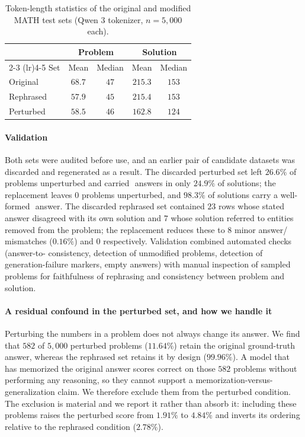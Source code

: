\begin{table}[h]
\centering
\caption{Token-length statistics of the original and modified MATH test sets (Qwen 3 tokenizer, $n=5{,}000$ each).}
\label{app:tab:modified_test_set_lengths}
\begin{tabular}{lcccc}
\toprule
& \multicolumn{2}{c}{Problem} & \multicolumn{2}{c}{Solution} \\
\cmidrule(lr){2-3} \cmidrule(lr){4-5}
Set & Mean & Median & Mean & Median \\
\midrule
Original  & $68.7$ & $47$ & $215.3$ & $153$ \\
Rephrased & $57.9$ & $45$ & $215.4$ & $153$ \\
Perturbed & $58.5$ & $46$ & $162.8$ & $124$ \\
\bottomrule
\end{tabular}
\end{table}

\paragraph{Validation}
Both sets were audited before use, and an earlier pair of candidate datasets was discarded and regenerated as a result.
The discarded perturbed set left $26.6\%$ of problems unperturbed and carried $\boxed{}$ answers in only $24.9\%$ of solutions; the replacement leaves $0$ problems unperturbed, and $98.3\%$ of solutions carry a well-formed $\boxed{}$ answer.
The discarded rephrased set contained $23$ rows whose stated answer disagreed with its own solution and $7$ whose solution referred to entities removed from the problem; the replacement reduces these to $8$ minor answer/$\boxed{}$ mismatches ($0.16\%$) and $0$ respectively.
Validation combined automated checks (answer-to-$\boxed{}$ consistency, detection of unmodified problems, detection of generation-failure markers, empty answers) with manual inspection of sampled problems for faithfulness of rephrasing and consistency between problem and solution.

\paragraph{A residual confound in the perturbed set, and how we handle it}
Perturbing the numbers in a problem does not always change its answer.
We find that $582$ of $5{,}000$ perturbed problems ($11.64\%$) retain the original ground-truth answer, whereas the rephrased set retains it by design ($99.96\%$).
A model that has memorized the original answer scores correct on those $582$ problems without performing any reasoning, so they cannot support a memorization-versus-generalization claim.
We therefore exclude them from the perturbed condition.
The exclusion is material and we report it rather than absorb it: including these problems raises the perturbed score from $1.91\%$ to $4.84\%$ and inverts its ordering relative to the rephrased condition ($2.78\%$).

